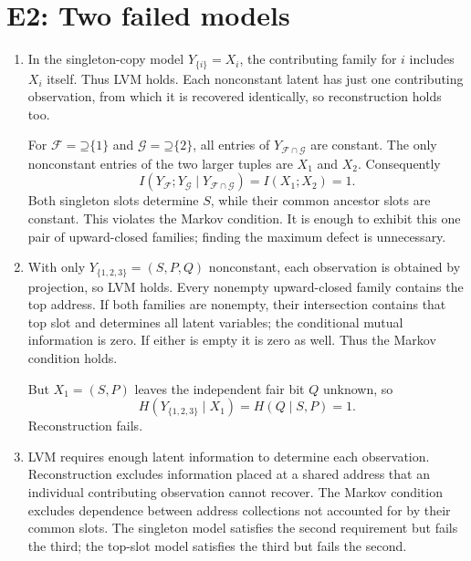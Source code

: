 \documentclass[11pt]{article}
\newcommand{\Up}{\mathord{\supseteq}}
\begin{document}
\section{E2: Two failed models}
\label{sec:e2}
\begin{enumerate}[label=(\alph*)]
\item In the singleton-copy model $Y_{\{i\}}=X_i$, the contributing family
for $i$ includes $X_i$ itself. Thus LVM holds. Each
nonconstant latent has just one contributing observation, from which it is
recovered identically, so reconstruction holds too.

For $\mathcal{F}=\Up\{1\}$ and $\mathcal{G}=\Up\{2\}$, all entries
of $Y_{\mathcal{F}\cap\mathcal{G}}$ are constant. The only nonconstant entries
of the two larger tuples are $X_1$ and $X_2$. Consequently
\[
 I(Y_{\mathcal{F}};Y_{\mathcal{G}}\mid Y_{\mathcal{F}\cap\mathcal{G}})
 =I(X_1;X_2)=1.
\]
Both singleton slots determine $S$, while their common ancestor slots are
constant. This violates the Markov condition. It is enough to
exhibit this one pair of upward-closed families; finding the maximum defect
is unnecessary.
\item With only $Y_{\{1,2,3\}}=(S,P,Q)$ nonconstant, each observation is
obtained by projection, so LVM holds. Every nonempty
upward-closed family contains the top address. If both families are nonempty,
their intersection contains that top slot and determines all latent variables;
the conditional mutual information is zero. If either is empty it is zero as
well. Thus the Markov condition holds.

But $X_1=(S,P)$ leaves the independent fair bit $Q$ unknown, so
\[
 H(Y_{\{1,2,3\}}\mid X_1)=H(Q\mid S,P)=1.
\]
Reconstruction fails.
\item LVM requires enough latent information to determine
each observation. Reconstruction excludes information placed at a shared
address that an individual contributing observation cannot recover. The Markov
condition excludes dependence between address collections not accounted for
by their common slots. The singleton model satisfies the second requirement but
fails the third; the top-slot model satisfies the third but fails the second.
\end{enumerate}
\end{document}
